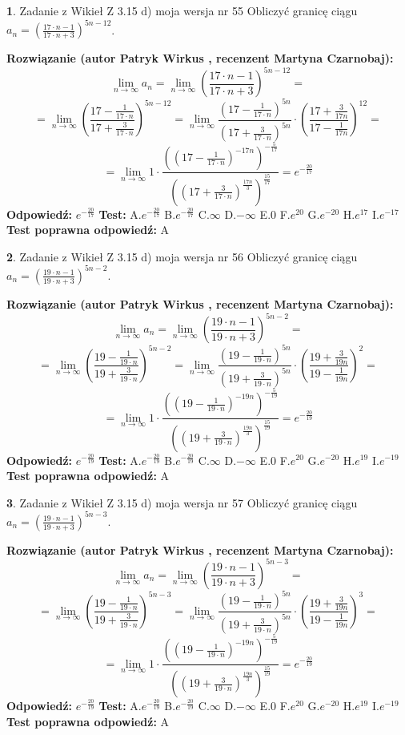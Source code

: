 \documentclass[12pt, a4paper]{article}
\theoremstyle{definition} %
\newtheorem{zad}{}
\newcommand{\zadStart}[1]{\begin{zad}#1\newline}
\newcommand{\zadStop}{\end{zad}}
\newcommand{\rozwStart}[2]{\noindent \textbf{Rozwiązanie (autor #1 , recenzent #2): }\newline}
\newcommand{\rozwStop}{\newline}
\newcommand{\odpStart}{\noindent \textbf{Odpowiedź:}\newline}
\newcommand{\odpStop}{\newline}
\newcommand{\testStart}{\noindent \textbf{Test:}\newline}
\newcommand{\testStop}{\newline}
\newcommand{\kluczStart}{\noindent \textbf{Test poprawna odpowiedź:}\newline}
\newcommand{\kluczStop}{\newline}
\begin{document}
\zadStart{Zadanie z Wikieł Z 3.15 d) moja wersja nr 55}
Obliczyć granicę ciągu $a_{n}=(\frac{17\cdot n - 1}{17 \cdot n + 3})^{5n-12}$.
\zadStop
\rozwStart{Patryk Wirkus}{Martyna Czarnobaj}
$$\lim\limits_{n\to\infty} a_{n} = \lim\limits_{n\to\infty}(\frac{17\cdot n - 1}{17 \cdot n + 3})^{5n-12}=$$
$$=\lim\limits_{n\to\infty}(\frac{17 - \frac{1}{17\cdot n}}{17 + \frac{3}{17 \cdot n}})^{5n-12}=\lim\limits_{n\to\infty}\frac{(17 - \frac{1}{17\cdot n})^{5n}}{(17 + \frac{3}{17\cdot n})^{5n}} \cdot (\frac{17+\frac{3}{17n}}{17-\frac{1}{17n}})^{12}=$$
$$=\lim\limits_{n\to\infty} 1 \cdot \frac{((17-\frac{1}{17 \cdot n})^{-17n})^{-\frac{5}{17}}}{((17+\frac{3}{17 \cdot n})^{\frac{17n}{3}})^{\frac{15}{17}}} =e^{-\frac{20}{17}}$$
\rozwStop
\odpStart
$e^{-\frac{20}{17}}$
\odpStop
\testStart
A.$ e^{-\frac{20}{17}}$
B.$ e^{-\frac{20}{17}}$
C.$\infty$
D.$-\infty$
E.$0$
F.$e^{20}$
G.$e^{-20}$
H.$e^{17}$
I.$e^{-17}$
\testStop
\kluczStart
A
\kluczStop



\zadStart{Zadanie z Wikieł Z 3.15 d) moja wersja nr 56}
Obliczyć granicę ciągu $a_{n}=(\frac{19\cdot n - 1}{19 \cdot n + 3})^{5n-2}$.
\zadStop
\rozwStart{Patryk Wirkus}{Martyna Czarnobaj}
$$\lim\limits_{n\to\infty} a_{n} = \lim\limits_{n\to\infty}(\frac{19\cdot n - 1}{19 \cdot n + 3})^{5n-2}=$$
$$=\lim\limits_{n\to\infty}(\frac{19 - \frac{1}{19\cdot n}}{19 + \frac{3}{19 \cdot n}})^{5n-2}=\lim\limits_{n\to\infty}\frac{(19 - \frac{1}{19\cdot n})^{5n}}{(19 + \frac{3}{19\cdot n})^{5n}} \cdot (\frac{19+\frac{3}{19n}}{19-\frac{1}{19n}})^{2}=$$
$$=\lim\limits_{n\to\infty} 1 \cdot \frac{((19-\frac{1}{19 \cdot n})^{-19n})^{-\frac{5}{19}}}{((19+\frac{3}{19 \cdot n})^{\frac{19n}{3}})^{\frac{15}{19}}} =e^{-\frac{20}{19}}$$
\rozwStop
\odpStart
$e^{-\frac{20}{19}}$
\odpStop
\testStart
A.$ e^{-\frac{20}{19}}$
B.$ e^{-\frac{20}{19}}$
C.$\infty$
D.$-\infty$
E.$0$
F.$e^{20}$
G.$e^{-20}$
H.$e^{19}$
I.$e^{-19}$
\testStop
\kluczStart
A
\kluczStop



\zadStart{Zadanie z Wikieł Z 3.15 d) moja wersja nr 57}
Obliczyć granicę ciągu $a_{n}=(\frac{19\cdot n - 1}{19 \cdot n + 3})^{5n-3}$.
\zadStop
\rozwStart{Patryk Wirkus}{Martyna Czarnobaj}
$$\lim\limits_{n\to\infty} a_{n} = \lim\limits_{n\to\infty}(\frac{19\cdot n - 1}{19 \cdot n + 3})^{5n-3}=$$
$$=\lim\limits_{n\to\infty}(\frac{19 - \frac{1}{19\cdot n}}{19 + \frac{3}{19 \cdot n}})^{5n-3}=\lim\limits_{n\to\infty}\frac{(19 - \frac{1}{19\cdot n})^{5n}}{(19 + \frac{3}{19\cdot n})^{5n}} \cdot (\frac{19+\frac{3}{19n}}{19-\frac{1}{19n}})^{3}=$$
$$=\lim\limits_{n\to\infty} 1 \cdot \frac{((19-\frac{1}{19 \cdot n})^{-19n})^{-\frac{5}{19}}}{((19+\frac{3}{19 \cdot n})^{\frac{19n}{3}})^{\frac{15}{19}}} =e^{-\frac{20}{19}}$$
\rozwStop
\odpStart
$e^{-\frac{20}{19}}$
\odpStop
\testStart
A.$ e^{-\frac{20}{19}}$
B.$ e^{-\frac{20}{19}}$
C.$\infty$
D.$-\infty$
E.$0$
F.$e^{20}$
G.$e^{-20}$
H.$e^{19}$
I.$e^{-19}$
\testStop
\kluczStart
A
\kluczStop
\end{document}
